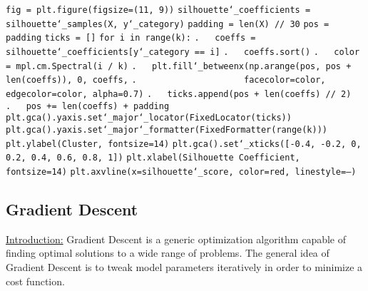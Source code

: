\texttt{fig = plt.figure(figsize=(11, 9))}\newline
\texttt{silhouette\char`_coefficients = silhouette\char`_samples(X, y\char`_category)}\newline
\texttt{padding = len(X) // 30}\newline
\texttt{pos = padding}\newline
\texttt{ticks = []}\newline
\texttt{for i in range(k):}\newline
\texttt{.~~~coeffs = silhouette\char`_coefficients[y\char`_category == i]}\newline
\texttt{.~~~coeffs.sort()}\newline
\texttt{.~~~color = mpl.cm.Spectral(i / k)}\newline
\texttt{.~~~plt.fill\char`_betweenx(np.arange(pos, pos + len(coeffs)), 0, coeffs,}\newline
\texttt{.~~~~~~~~~~~~~~~~~~~~~facecolor=color, edgecolor=color, alpha=0.7)}\newline
\texttt{.~~~ticks.append(pos + len(coeffs) // 2)}\newline
\texttt{.~~~pos += len(coeffs) + padding}\newline
\texttt{plt.gca().yaxis.set\char`_major\char`_locator(FixedLocator(ticks))}\newline
\texttt{plt.gca().yaxis.set\char`_major\char`_formatter(FixedFormatter(range(k)))}\newline
\texttt{plt.ylabel(\textquotesingle Cluster\textquotesingle , fontsize=14)}\newline
\texttt{plt.gca().set\char`_xticks([-0.4, -0.2, 0, 0.2, 0.4, 0.6, 0.8, 1])}\newline
\texttt{plt.xlabel(\textquotesingle Silhouette Coefficient\textquotesingle , fontsize=14)}\newline
\texttt{plt.axvline(x=silhouette\char`_score, color=\textquotesingle red\textquotesingle , linestyle=\textquotesingle --\textquotesingle )}\newline

\subsection{Gradient Descent}

\underline{Introduction:}\newline
Gradient Descent is a generic optimization algorithm capable of finding optimal solutions to a wide range of problems. 
The general idea of Gradient Descent is to tweak model parameters iteratively in order to minimize a cost function.

